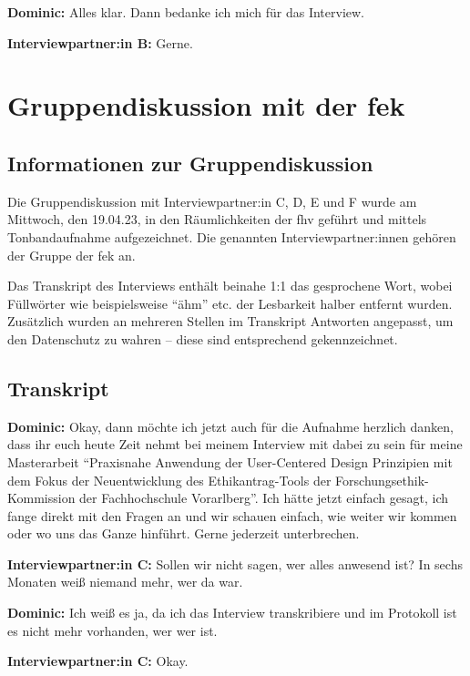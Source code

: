\documentclass[a4paper,12pt,twoside]{scrreprt}
\begin{document}
\textbf{Dominic:} Alles klar. Dann bedanke ich mich für das Interview.

\textbf{Interviewpartner:in B:} Gerne.

\chapter{Gruppendiskussion mit der \acl{fek}}
\label{appendix:gruppendiskussion}

\section{Informationen zur Gruppendiskussion}
\label{appendix:gruppendiskussion-infos}

Die Gruppendiskussion mit Interviewpartner:in C, D, E und F wurde am Mittwoch, den 19.04.23, in den Räumlichkeiten der \ac{fhv} geführt und mittels Tonbandaufnahme aufgezeichnet. Die genannten Interviewpartner:innen gehören der Gruppe der \acl{fek} an.

Das Transkript des Interviews enthält beinahe 1:1 das gesprochene Wort, wobei Füllwörter wie beispielsweise \enquote{ähm} etc. der Lesbarkeit halber entfernt wurden. Zusätzlich wurden an mehreren Stellen im Transkript Antworten angepasst, um den Datenschutz zu wahren -- diese sind entsprechend gekennzeichnet.

\section{Transkript}
\label{appendix:gruppendiskussion-transkript}

\textbf{Dominic:} Okay, dann möchte ich jetzt auch für die Aufnahme herzlich danken, dass ihr euch heute Zeit nehmt bei meinem Interview mit dabei zu sein für meine Masterarbeit \enquote{Praxisnahe Anwendung der User-Centered Design Prinzipien mit dem Fokus der Neuentwicklung des Ethikantrag-Tools der Forschungsethik-Kommission der Fachhochschule Vorarlberg}. Ich hätte jetzt einfach gesagt, ich fange direkt mit den Fragen an und wir schauen einfach, wie weiter wir kommen oder wo uns das Ganze hinführt. Gerne jederzeit unterbrechen.

\textbf{Interviewpartner:in C:} Sollen wir nicht sagen, wer alles anwesend ist? In sechs Monaten weiß niemand mehr, wer da war.

\textbf{Dominic:} Ich weiß es ja, da ich das Interview transkribiere und im Protokoll ist es nicht mehr vorhanden, wer wer ist.

\textbf{Interviewpartner:in C:} Okay.
\end{document}

